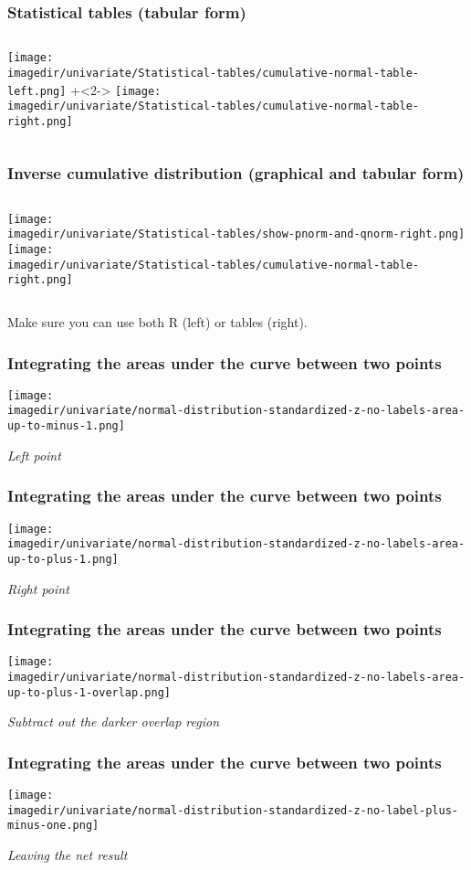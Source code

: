 \begin{frame}\frametitle{Statistical tables (tabular form)}
	\begin{columns}[T]
			\texttt{[image: \\imagedir/univariate/Statistical-tables/cumulative-normal-table-left.png]}
			\onslide+<2->{
				\texttt{[image: \\imagedir/univariate/Statistical-tables/cumulative-normal-table-right.png]}
			}
	\end{columns}
\end{frame}

\begin{frame}\frametitle{Inverse cumulative distribution (graphical and tabular form)}
	\begin{columns}[T]
			\texttt{[image: \\imagedir/univariate/Statistical-tables/show-pnorm-and-qnorm-right.png]}
			\texttt{[image: \\imagedir/univariate/Statistical-tables/cumulative-normal-table-right.png]}
	\end{columns}
	Make sure you can use both R (left) or tables (right).
\end{frame}

\begin{frame}\frametitle{Integrating the areas under the curve between two points}
	\centerline{	\texttt{[image: \\imagedir/univariate/normal-distribution-standardized-z-no-labels-area-up-to-minus-1.png]}	}
	
	\emph{Left point}
\end{frame}

\begin{frame}\frametitle{Integrating the areas under the curve between two points}
	\centerline{	\texttt{[image: \\imagedir/univariate/normal-distribution-standardized-z-no-labels-area-up-to-plus-1.png]}	}
	
	\emph{Right point}
\end{frame}

\begin{frame}\frametitle{Integrating the areas under the curve between two points}
	\centerline{	\texttt{[image: \\imagedir/univariate/normal-distribution-standardized-z-no-labels-area-up-to-plus-1-overlap.png]}	}
	
	\emph{Subtract out the darker overlap region}
\end{frame}

\begin{frame}\frametitle{Integrating the areas under the curve between two points}
	\centerline{	\texttt{[image: \\imagedir/univariate/normal-distribution-standardized-z-no-label-plus-minus-one.png]}	}
	
	\emph{Leaving the net result}
\end{frame}

